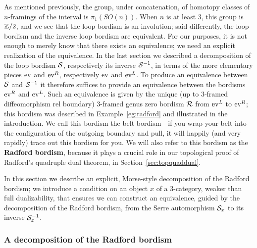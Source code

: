 \documentclass{amsart}
\begin{document}
As mentioned previously, the group, under concatenation, of homotopy classes of $n$-framings of the interval is $\pi_1(SO(n))$.  When $n$ is at least 3, this group is $\mathbb Z/2$, and we see that the loop bordism is an involution; said differently, the loop bordism and the inverse loop bordism are equivalent.  For our purposes, it is not enough to merely know that there exists an equivalence; we need an explicit realization of the equivalence.  In the last section we described a decomposition of the loop bordism $\mathcal S$, respectively its inverse $\mathcal S^{-1}$, in terms of the more elementary pieces $\mathrm{ev}$ and $\mathrm{ev}^R$, respectively $\mathrm{ev}$ and $\mathrm{ev}^L$.   To produce an equivalence between $\mathcal S$ and $\mathcal S^{-1}$ it therefore suffices to provide an equivalence between the bordisms $\mathrm{ev}^R$ and $\mathrm{ev}^L$.  Such an equivalence is given by the unique (up to 3-framed diffeomorphism rel boundary) 3-framed genus zero bordism $\mathcal R$ from $\mathrm{ev}^L$ to $\mathrm{ev}^R$; this bordism was described in Example~\ref{eg:radford} and illustrated in the introduction.  We call this bordism the belt bordism---if you wrap your belt into the configuration of the outgoing boundary and pull, it will happily (and very rapidly) trace out this bordism for you.  We will also refer to this bordism as the {\bfseries Radford bordism}, because it plays a crucial role in our topological proof of Radford's quadruple dual theorem, in Section~\ref{sec:topquaddual}.

In this section we describe an explicit, Morse-style decomposition of the Radford bordism; we introduce a condition on an object $x$ of a 3-category, weaker than full dualizability, that ensures we can construct an equivalence, guided by the decomposition of the Radford bordism, from the Serre automorphism $\mathcal S_x$ to its inverse $\mathcal S_x^{-1}$.

\subsubsection{A decomposition of the Radford bordism}
\end{document}

